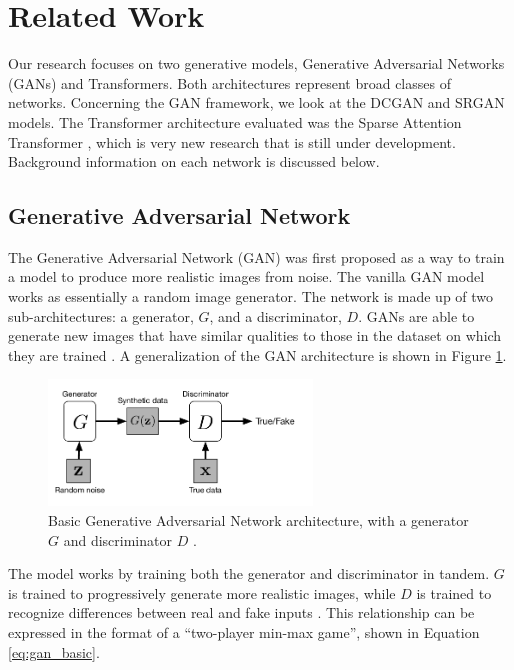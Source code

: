 \documentclass[letterpaper]{article} %
\begin{document}
\section{Related Work}
Our research focuses on two generative models,
Generative Adversarial Networks (GANs) and Transformers.
Both architectures represent broad classes of networks.
Concerning the GAN framework, we look at the
DCGAN
\cite{generative_adversarial_networks} and SRGAN
\cite{srgan} models.
The Transformer architecture evaluated was the Sparse Attention Transformer
\cite{generative_transformers}, which is very new research that is
still under development.
Background information on each network is discussed below.

\subsection{Generative Adversarial Network}
The Generative Adversarial Network (GAN)
was first proposed as a way to train a model to produce more realistic images
from noise. The vanilla GAN model works as essentially a random image generator.
The network is made up of two sub-architectures:
a generator, $G$, and a discriminator, $D$.
GANs are able to generate new images that have similar qualities to
those in the dataset on which they are trained
\cite{generative_adversarial_networks}.
A generalization of the GAN architecture is shown in Figure \ref{fig:gan_architecture}.

\begin{figure}[htbp]
\centerline{\includegraphics[width=7cm]{gan_architecture.png}}
\caption{Basic Generative Adversarial Network architecture, with a generator $G$
and discriminator $D$
\cite{cgan}.}
\label{fig:gan_architecture}
\end{figure}

The model works by training both the generator and
discriminator in tandem.
$G$ is trained to progressively generate more realistic images,
while $D$ is trained to recognize differences between real and fake inputs \cite{cgan}.
This relationship can be expressed in the format of a
``two-player min-max game'', shown in Equation \ref{eq:gan_basic}.
\end{document}
